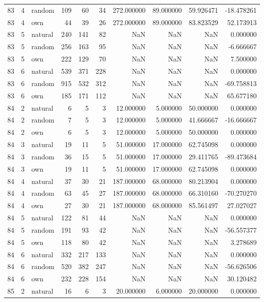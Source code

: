 \begin{table}[htbp]
\begin{tabular}{rrlrrrrrrr}
83 & 4 & random & 109 & 60 & 34 & 272.000000 & 89.000000 & 59.926471 & -18.478261 \\
83 & 4 & own & 44 & 39 & 26 & 272.000000 & 89.000000 & 83.823529 & 52.173913 \\
83 & 5 & natural & 240 & 141 & 82 & NaN & NaN & NaN & 0.000000 \\
83 & 5 & random & 256 & 163 & 95 & NaN & NaN & NaN & -6.666667 \\
83 & 5 & own & 222 & 129 & 70 & NaN & NaN & NaN & 7.500000 \\
83 & 6 & natural & 539 & 371 & 228 & NaN & NaN & NaN & 0.000000 \\
83 & 6 & random & 915 & 532 & 312 & NaN & NaN & NaN & -69.758813 \\
83 & 6 & own & 185 & 171 & 112 & NaN & NaN & NaN & 65.677180 \\
84 & 2 & natural & 6 & 5 & 3 & 12.000000 & 5.000000 & 50.000000 & 0.000000 \\
84 & 2 & random & 7 & 5 & 3 & 12.000000 & 5.000000 & 41.666667 & -16.666667 \\
84 & 2 & own & 6 & 5 & 3 & 12.000000 & 5.000000 & 50.000000 & 0.000000 \\
84 & 3 & natural & 19 & 11 & 5 & 51.000000 & 17.000000 & 62.745098 & 0.000000 \\
84 & 3 & random & 36 & 15 & 5 & 51.000000 & 17.000000 & 29.411765 & -89.473684 \\
84 & 3 & own & 19 & 11 & 5 & 51.000000 & 17.000000 & 62.745098 & 0.000000 \\
84 & 4 & natural & 37 & 30 & 21 & 187.000000 & 68.000000 & 80.213904 & 0.000000 \\
84 & 4 & random & 63 & 45 & 27 & 187.000000 & 68.000000 & 66.310160 & -70.270270 \\
84 & 4 & own & 27 & 30 & 21 & 187.000000 & 68.000000 & 85.561497 & 27.027027 \\
84 & 5 & natural & 122 & 81 & 44 & NaN & NaN & NaN & 0.000000 \\
84 & 5 & random & 191 & 93 & 42 & NaN & NaN & NaN & -56.557377 \\
84 & 5 & own & 118 & 80 & 42 & NaN & NaN & NaN & 3.278689 \\
84 & 6 & natural & 332 & 217 & 133 & NaN & NaN & NaN & 0.000000 \\
84 & 6 & random & 520 & 382 & 247 & NaN & NaN & NaN & -56.626506 \\
84 & 6 & own & 232 & 228 & 154 & NaN & NaN & NaN & 30.120482 \\
85 & 2 & natural & 16 & 6 & 3 & 20.000000 & 6.000000 & 20.000000 & 0.000000 \\

\end{tabular}
\end{table}
